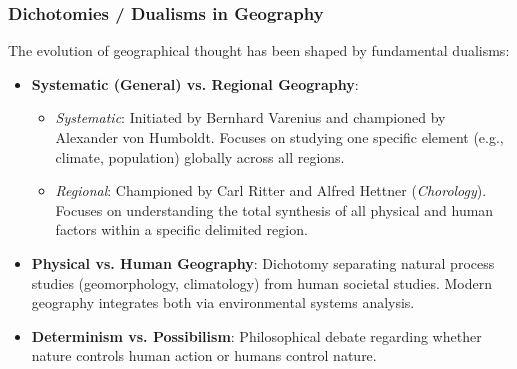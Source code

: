 \documentclass[11pt,a4paper]{article}
\begin{document}
\subsubsection{Dichotomies / Dualisms in Geography}
The evolution of geographical thought has been shaped by fundamental dualisms:
\begin{itemize}[leftmargin=*]
  \item \textbf{Systematic (General) vs. Regional Geography}:
  \begin{itemize}
    \item \textit{Systematic}: Initiated by Bernhard Varenius and championed by Alexander von Humboldt. Focuses on studying one specific element (e.g., climate, population) globally across all regions.
    \item \textit{Regional}: Championed by Carl Ritter and Alfred Hettner (\textit{Chorology}). Focuses on understanding the total synthesis of all physical and human factors within a specific delimited region.
  \end{itemize}
  \item \textbf{Physical vs. Human Geography}: Dichotomy separating natural process studies (geomorphology, climatology) from human societal studies. Modern geography integrates both via environmental systems analysis.
  \item \textbf{Determinism vs. Possibilism}: Philosophical debate regarding whether nature controls human action or humans control nature.
\end{itemize}
\end{document}
